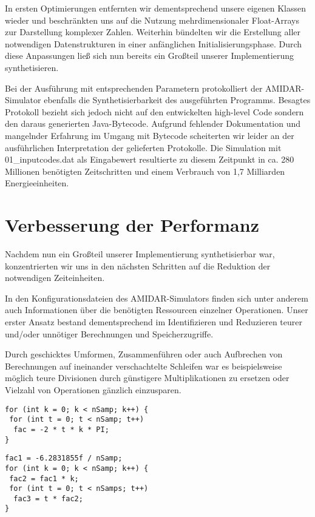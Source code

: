 \documentclass[parskip,
							 oneside,
							 11pt,
							 noheadingspace,
							 accentcolor=tud1d,
							 bigchapter,
							 colorback]{tudreport}
\begin{document}
In ersten Optimierungen entfernten wir dementsprechend unsere eigenen Klassen wieder und beschränkten uns auf die Nutzung mehrdimensionaler Float-Arrays zur Darstellung komplexer Zahlen. Weiterhin bündelten wir die Erstellung aller notwendigen Datenstrukturen in einer anfänglichen Initialisierungsphase. Durch diese Anpassungen ließ sich nun bereits ein Großteil unserer Implementierung synthetisieren. 

Bei der Ausführung mit entsprechenden Parametern protokolliert der AMIDAR-Simulator ebenfalls die Synthetisierbarkeit des ausgeführten Programms. Besagtes Protokoll bezieht sich jedoch nicht auf den entwickelten high-level Code sondern den daraus generierten Java-Bytecode. Aufgrund fehlender Dokumentation und mangelnder Erfahrung im Umgang mit Bytecode scheiterten wir leider an der ausführlichen Interpretation der gelieferten Protokolle. Die Simulation mit 01\_inputcodes.dat als Eingabewert resultierte zu diesem Zeitpunkt in ca. 280 Millionen benötigten Zeitschritten und einem Verbrauch von 1,7 Milliarden Energieeinheiten.

\section{Verbesserung der Performanz}
Nachdem nun ein Großteil unserer Implementierung synthetisierbar war, konzentrierten wir uns in den nächsten Schritten auf die Reduktion der notwendigen Zeiteinheiten. 

In den Konfigurationsdateien des AMIDAR-Simulators finden sich unter anderem auch Informationen über die benötigten Ressourcen einzelner Operationen. Unser erster Ansatz bestand dementsprechend im Identifizieren und Reduzieren teurer und/oder unnötiger Berechnungen und Speicherzugriffe.

Durch geschicktes Umformen, Zusammenführen oder auch Aufbrechen von Berechnungen auf ineinander verschachtelte Schleifen war es beispielsweise möglich teure Divisionen durch günstigere Multiplikationen zu ersetzen oder Vielzahl von Operationen gänzlich einzusparen.


\noindent
\begin{minipage}[t]{.49\textwidth}
\hspace*{0pt}
\begin{lstlisting}[basicstyle=\small, caption = Naiver Ansatz]
for (int k = 0; k < nSamp; k++) { 
 for (int t = 0; t < nSamp; t++) 
  fac = -2 * t * k * PI;
}
\end{lstlisting}
\end{minipage}
\hfill
\begin{minipage}[t]{.49\textwidth}
\hspace*{0pt}
\begin{lstlisting}[basicstyle=\small, caption= Optimierter Ansatz]
fac1 = -6.2831855f / nSamp;
for (int k = 0; k < nSamp; k++) { 
 fac2 = fac1 * k; 
 for (int t = 0; t < nSamps; t++) 
  fac3 = t * fac2;
}
\end{lstlisting}
\end{minipage}
\end{document}
